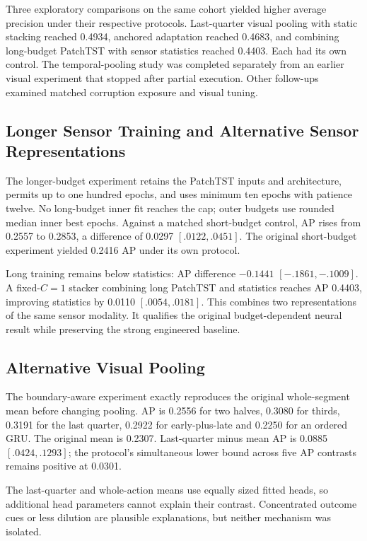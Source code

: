 Three exploratory comparisons on the same cohort yielded higher average precision under
their respective protocols. Last-quarter visual pooling with static stacking reached
0.4934, anchored adaptation reached 0.4683, and combining long-budget PatchTST with
sensor statistics reached 0.4403. Each had its own control. The temporal-pooling study
was completed separately from an earlier visual experiment that stopped after partial
execution. Other follow-ups examined matched corruption exposure and visual
tuning.

\subsection{Longer Sensor Training and Alternative Sensor Representations}
The longer-budget experiment retains the PatchTST inputs and architecture, permits up to
one hundred epochs, and uses minimum ten epochs with patience twelve. No long-budget
inner fit reaches the cap; outer budgets use rounded median inner best epochs. Against a
matched short-budget control, AP rises from 0.2557 to 0.2853, a difference of 0.0297
$[.0122,.0451]$. The original short-budget experiment yielded 0.2416 AP under its own
protocol.

Long training remains below statistics: AP difference $-0.1441$ $[-.1861,-.1009]$. A
fixed-$C=1$ stacker combining long PatchTST and statistics reaches AP 0.4403, improving
statistics by 0.0110 $[.0054,.0181]$. This combines two representations of the same
sensor modality. It qualifies the original budget-dependent neural result while
preserving the strong engineered baseline.

\subsection{Alternative Visual Pooling}
The boundary-aware experiment exactly reproduces the original whole-segment mean before
changing pooling. AP is 0.2556 for two halves, 0.3080 for thirds, 0.3191 for the last
quarter, 0.2922 for early-plus-late and 0.2250 for an ordered GRU. The original mean is
0.2307. Last-quarter minus mean AP is 0.0885 $[.0424,.1293]$; the protocol's
simultaneous lower bound across five AP contrasts remains positive at 0.0301.

The last-quarter and whole-action means use equally sized fitted heads, so additional
head parameters cannot explain their contrast. Concentrated outcome cues or less
dilution are plausible explanations, but neither mechanism was isolated.

